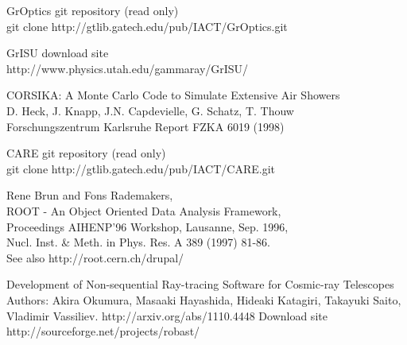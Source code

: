 \documentclass{article}
\begin{document}
\begin{thebibliography}{4}
    GrOptics git repository (read only) \\
    git clone http://gtlib.gatech.edu/pub/IACT/GrOptics.git

    GrISU download site \\
    http://www.physics.utah.edu/gammaray/GrISU/

    CORSIKA: A Monte Carlo Code to Simulate Extensive Air Showers\\
    D. Heck, J. Knapp, J.N. Capdevielle, G. Schatz, T. Thouw \\
    Forschungszentrum Karlsruhe Report FZKA 6019 (1998)

   CARE git repository (read only) \\
   git clone http://gtlib.gatech.edu/pub/IACT/CARE.git

   Rene Brun and Fons Rademakers,\\
   ROOT - An Object Oriented Data Analysis Framework,\\
   Proceedings AIHENP'96 Workshop, Lausanne, Sep. 1996, \\
   Nucl. Inst. \& Meth. in Phys. Res. A 389 (1997) 81-86. \\
   See also http://root.cern.ch/drupal/

   Development of Non-sequential Ray-tracing Software for Cosmic-ray Telescopes
   Authors: Akira Okumura, Masaaki Hayashida, Hideaki Katagiri, Takayuki Saito,
   Vladimir Vassiliev.  http://arxiv.org/abs/1110.4448
   Download site http://sourceforge.net/projects/robast/

\end{thebibliography}
\end{document}
